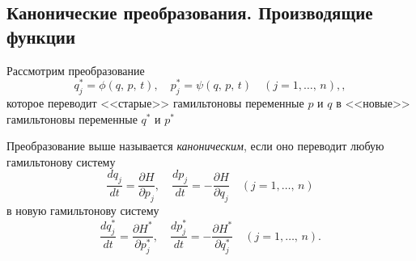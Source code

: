 \documentclass[a4paper,12pt]{article}
\begin{document}
\subsection{Канонические преобразования. Производящие функции}
\label{subsec:tr}
Рассмотрим преобразование
\[
	q^*_j=\phi(q,\,p,\,t),\quad p^*_j=\psi(q,\,p,\,t)\quad (j=1,\ldots,\,n),
,\] 
которое переводит <<старые>> гамильтоновы переменные $p$ и $q$ в
<<новые>> гамильтоновы переменные $q^*$ и $p^*$ 
\begin{dfn}
	Преобразование выше  называется \emph{каноническим}, если оно переводит
	любую гамильтонову систему
	\[
	\frac{dq_j}{dt}=\frac{\partial H}{\partial p_j} , \quad
	\frac{dp_j}{dt}=-\frac{\partial H}{\partial q_j}  \quad
	(j=1,\ldots,\,n)
\]
в новую гамильтонову систему
\[
\frac{dq^*_j}{dt}=\frac{\partial H^*}{\partial p^*_j} ,\quad
\frac{dp^*_j}{dt}=-\frac{\partial H^*}{\partial q^*_j} \quad
(j=1,\ldots,\,n)
.\] 
\end{dfn}
\end{document}
